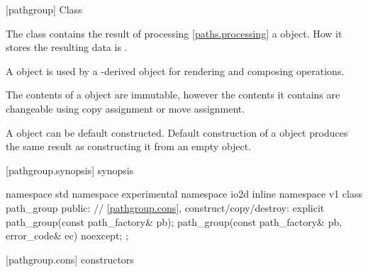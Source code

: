  [pathgroup] {Class }

\pnum
{}
The class  contains the result of processing \ref{paths.processing} a  object. How it stores the resulting data is \unspecnorm.

\pnum
A  object is used by a -derived object for rendering and composing operations.

\pnum
The contents of a  object are immutable, however the contents it contains are changeable using copy assignment or move assignment.

\pnum
A  object can be default constructed. Default construction of a  object produces the same result as constructing it from an empty  object.
%

%
 [pathgroup.synopsis] { synopsis}

\begin{codeblock}
namespace std { namespace experimental { namespace io2d { inline namespace v1 {
  class path_group {
    public:
    // \ref{pathgroup.cons}, construct/copy/destroy:
    explicit path_group(const path_factory& pb);
    path_group(const path_factory& pb, error_code& ec) noexcept;
  };
} } } }
\end{codeblock}

 [pathgroup.cons] { constructors}

